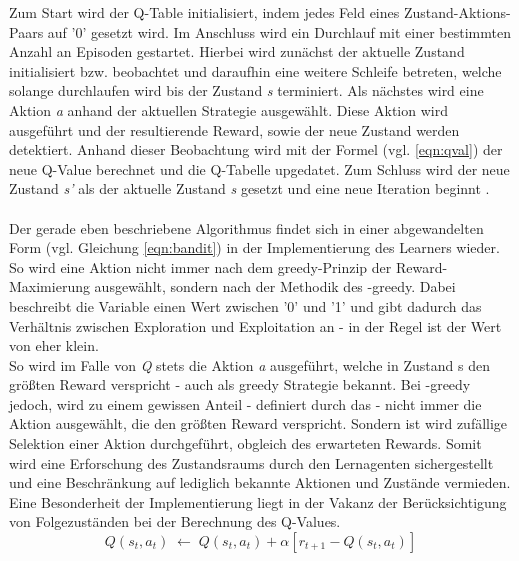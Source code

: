 Zum Start wird der Q-Table initialisiert, indem jedes Feld eines Zustand-Aktions-Paars auf '0' gesetzt wird. Im Anschluss wird ein Durchlauf mit einer bestimmten Anzahl an Episoden gestartet. Hierbei wird zunächst der aktuelle Zustand initialisiert bzw. beobachtet und daraufhin eine weitere Schleife betreten, welche solange durchlaufen wird bis der Zustand \textit{s}  terminiert. Als nächstes wird eine Aktion \textit{a}  anhand der aktuellen Strategie ausgewählt. Diese Aktion wird ausgeführt und der resultierende Reward, sowie der neue Zustand werden detektiert. Anhand dieser Beobachtung wird mit der Formel (vgl. \ref{eqn:qval}) der neue Q-Value berechnet und die Q-Tabelle upgedatet. Zum Schluss wird der neue Zustand \textit{s'} als der 
aktuelle Zustand \textit{s} gesetzt und eine neue Iteration beginnt \cite{Sutton, mlmitchel, MultiagentSystems}. \\\\
Der gerade eben beschriebene Algorithmus findet sich in einer abgewandelten Form (vgl. Gleichung \ref{eqn:bandit}) in der Implementierung des Learners wieder. So wird eine Aktion nicht immer nach dem greedy-Prinzip der Reward-Maximierung ausgewählt, sondern nach der Methodik des \textit{\textepsilon}-greedy. Dabei beschreibt die Variable \textit{\textepsilon} einen Wert zwischen '0' und '1' und gibt dadurch das Verhältnis zwischen Exploration und Exploitation an - in der Regel ist der Wert von \textit{\textepsilon} eher klein. \\
So wird im Falle von \textit{Q} stets die Aktion \textit{a} ausgeführt, welche in Zustand s den größten Reward verspricht - auch als greedy Strategie bekannt. Bei \textit{\textepsilon}-greedy jedoch, wird zu einem gewissen Anteil - definiert durch das \textit{\textepsilon} - nicht immer die Aktion ausgewählt, die den größten Reward verspricht. Sondern ist wird zufällige Selektion einer Aktion durchgeführt,  obgleich des erwarteten Rewards. Somit wird eine Erforschung des Zustandsraums durch den Lernagenten sichergestellt und eine Beschränkung auf lediglich bekannte Aktionen und Zustände vermieden. \\
Eine Besonderheit der Implementierung liegt in der Vakanz der Berücksichtigung von Folgezuständen bei der Berechnung des Q-Values.
\begin{equation} \label{eqn:bandit}
		Q(s_t,a_t)\;\leftarrow\;Q(s_t,a_t) + \alpha [ r_{t+1} - Q(s_t,a_t) ]
\end{equation}

